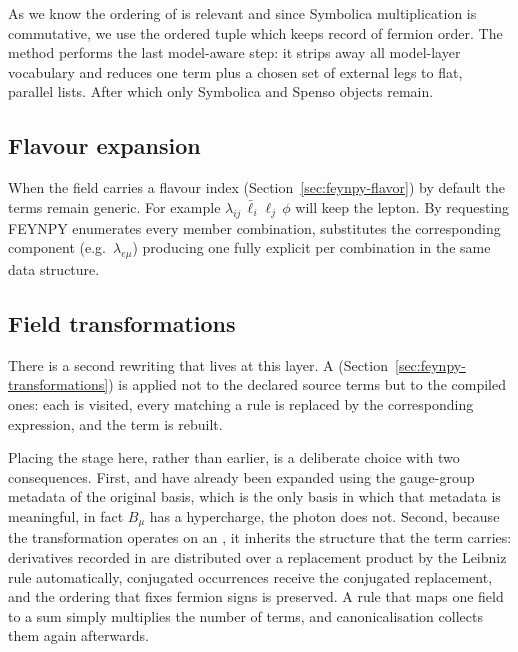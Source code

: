 As we know the ordering of  is relevant and since Symbolica multiplication is commutative, we use the ordered tuple which keeps record of fermion order.
The method  performs the last model-aware step: it strips away all model-layer vocabulary and reduces one term plus a chosen set of external legs to flat, parallel lists. After which only Symbolica and Spenso objects remain.

\subsection*{Flavour expansion}

When the field carries a flavour index (Section~\ref{sec:feynpy-flavor}) by default the terms remain generic. For example $\lambda_{ij}\,\bar\ell_i \ell_j\,\phi$ will keep the lepton. By requesting  FEYNPY enumerates every member combination, substitutes the corresponding  component (e.g.\ $\lambda_{e\mu}$) producing one fully explicit  per combination in the same data structure.

\subsection*{Field transformations}
\label{sec:internals-transformations}

There is a second rewriting that lives at this layer. A  (Section~\ref{sec:feynpy-transformations}) is applied not to the declared source terms but to the compiled ones: each  is visited, every  matching a rule is replaced by the corresponding expression, and the term is rebuilt.

Placing the stage here, rather than earlier, is a deliberate choice with two consequences. First,  and  have already been expanded using the gauge-group metadata of the original basis, which is the only basis in which that metadata is meaningful, in fact $B_\mu$ has a hypercharge, the photon does not. Second, because the transformation operates on an , it inherits the structure that the term carries: derivatives recorded in  are distributed over a replacement product by the Leibniz rule automatically, conjugated occurrences receive the conjugated replacement, and the ordering that fixes fermion signs is preserved. A rule that maps one field to a sum simply multiplies the number of terms, and canonicalisation collects them again afterwards.


